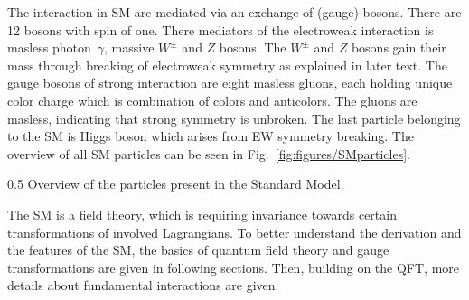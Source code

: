 The interaction in SM are mediated via an exchange of (gauge) bosons. There are 12 bosons with spin of one. There mediators of the electroweak interaction is masless photon~$\gamma$, massive $W^{\pm}$ and $Z$ bosons. The $W^{\pm}$ and $Z$ bosons gain their mass through breaking of electroweak symmetry as explained in later text. The gauge bosons of strong interaction are eight masless gluons, each holding unique color charge which is combination of colors and anticolors. The gluons are masless, indicating that strong symmetry is unbroken. The last particle belonging to the SM is Higgs boson which arises from EW symmetry breaking. The overview of all SM particles can be seen in Fig.~\ref{fig:figures/SMparticles}.


                 {0.5}       %
                 { Overview of the particles present in the Standard Model.}



The SM is a field theory, which is requiring invariance towards certain transformations of involved Lagrangians. To better understand the derivation and the features of the SM, the basics of quantum field theory and gauge transformations are given in following sections. Then, building on the QFT, more details about fundamental interactions are given.

